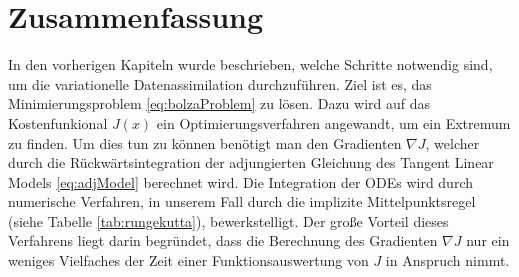 \section{Zusammenfassung}
In den vorherigen Kapiteln wurde beschrieben, welche Schritte notwendig sind, um die variationelle Datenassimilation durchzuführen.
Ziel ist es, das Minimierungsproblem \eqref{eq:bolzaProblem} zu lösen. Dazu wird auf das Kostenfunkional $J(x)$ ein Optimierungsverfahren angewandt, um ein Extremum zu finden. Um dies tun zu können benötigt man den Gradienten $\nabla J$, welcher durch die Rückwärtsintegration der adjungierten Gleichung des Tangent Linear Models \eqref{eq:adjModel} berechnet wird. Die Integration der ODEs wird durch numerische Verfahren, in unserem Fall durch die implizite Mittelpunktsregel (siehe Tabelle \ref{tab:rungekutta}), bewerkstelligt. Der große Vorteil dieses Verfahrens liegt darin begründet, dass die Berechnung des Gradienten $\nabla J$ nur ein weniges Vielfaches der Zeit einer Funktionsauswertung von $J$ in Anspruch nimmt. 

